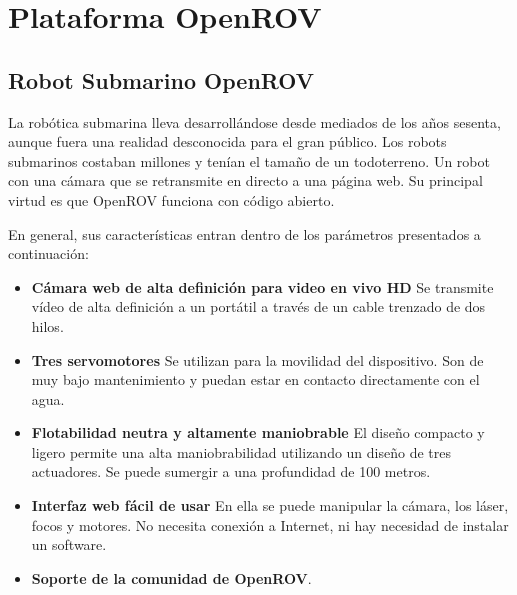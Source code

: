 \chapter{Plataforma OpenROV}
\label{cap:plataformaOpenROV}

\section{Robot Submarino OpenROV}
\label{cap:Robot Submarino OpenROV}
La robótica submarina lleva desarrollándose desde mediados de los años sesenta, aunque fuera una realidad desconocida para el gran público. Los robots submarinos costaban millones y tenían el tamaño de un todoterreno. Un robot con una cámara que se retransmite en directo a una página web. Su principal virtud es que OpenROV\cite{openrov} funciona con código abierto.

En general, sus características entran dentro de los parámetros presentados a continuación:

  \begin{itemize}
  \item \textbf{Cámara web de alta definición para video en vivo HD} Se transmite vídeo de alta definición a un portátil a través de un cable trenzado de dos hilos.
  \item \textbf{Tres servomotores} Se utilizan para la movilidad del dispositivo. Son de muy bajo mantenimiento y puedan estar en contacto directamente con el agua.
  \item \textbf{Flotabilidad neutra y altamente maniobrable} El diseño compacto y ligero permite una alta maniobrabilidad utilizando un diseño de tres actuadores. Se puede sumergir a una profundidad de 100 metros.
  \item \textbf{Interfaz web fácil de usar} En ella se puede manipular la cámara, los láser, focos y motores. No necesita conexión a Internet, ni hay necesidad de instalar un software.
  \item \textbf{Soporte de la comunidad de OpenROV}.
  \end{itemize}

